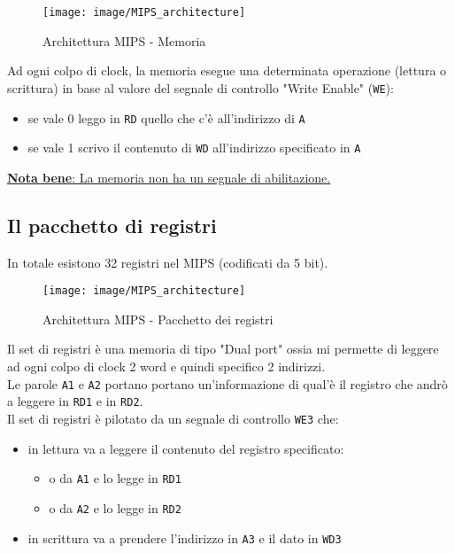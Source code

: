 \documentclass[../main.tex]{subfiles}
\begin{document}
    \begin{figure}[h!]
        \centering

        \vspace*{5mm}
        \texttt{[image: image/MIPS\_architecture]}
        \newline
        \caption{Architettura MIPS - Memoria}
        \vspace*{5mm}
    \end{figure}

    Ad ogni colpo di clock, la memoria esegue una determinata operazione
    (lettura o scrittura) in base al valore del segnale di controllo
    "Write Enable" (\texttt{WE}):
    \begin{itemize}
        \item se vale 0 leggo in \texttt{RD} quello che c'è all'indirizzo di \texttt{A}
        \item se vale 1 scrivo il contenuto di \texttt{WD} all'indirizzo specificato in \texttt{A}
    \end{itemize}
    \vspace*{1mm}
    \underline{\textbf{Nota bene}: La memoria non ha
    un segnale di abilitazione.}

    \newpage

    \subsection{Il pacchetto di registri}
    In totale esistono 32 registri nel MIPS (codificati da 5 bit).

    \begin{figure}[h!]
        \centering

        \vspace*{5mm}
        \texttt{[image: image/MIPS\_architecture]}
        \newline
        \caption{Architettura MIPS - Pacchetto dei registri}
        \vspace*{5mm}
    \end{figure}

    Il set di registri è una memoria di tipo "Dual port" ossia mi
    permette di leggere ad ogni colpo di clock 2 word e quindi
    specifico 2 indirizzi. \\[1mm]
    Le parole \texttt{A1} e \texttt{A2} portano portano un'informazione
    di qual'è il registro che andrò a leggere
    in \texttt{RD1} e in \texttt{RD2}. \\
    Il set di registri è pilotato da un segnale di controllo
    \texttt{WE3} che:
    \begin{itemize}
        \item in lettura va a leggere il contenuto del registro
        specificato:
        \begin{itemize}
            \item o da \texttt{A1} e lo legge in \texttt{RD1}
            \item o da \texttt{A2} e lo legge in \texttt{RD2}
        \end{itemize}
        \item in scrittura va a prendere l'indirizzo in \texttt{A3}
        e il dato in \texttt{WD3}
    \end{itemize}
\end{document}
